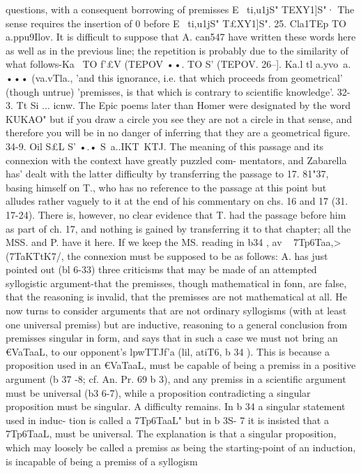 {{{{{{{{{{{{questions, with a consequent borrowing of premisses E~ ti,u1jS"
TEXY1]S"·
The sense requires the insertion of 0 before E~ ti,u1jS" T£XY1]S".
25. Cla1TEp TO a.ppu9Ilov. It is difficult to suppose that A. can547
have written these words here as well as in the previous line; the
repetition is probably due to the similarity of what follows-Ka~
TO f'£V (TEPOV ••. TO S' (TEPOV.
26--]. Ka.l tl a.yvo~a. ••• (va.vTla., 'and this ignorance, i.e. that
which proceeds from geometrical' (though untrue) 'premisses, is
that which is contrary to scientific knowledge'.
32-3. Tt Si ... icnw. The Epic poems later than Homer were
designated by the word KUKAO" but if you draw a circle you see
they are not a circle in that sense, and therefore you will be in
no danger of inferring that they are a geometrical figure.
34-9. Oil S£L S' •.• S~a.}.IKT~KTJ. The meaning of this passage
and its connexion with the context have greatly puzzled com-
mentators, and Zabarella has' dealt with the latter difficulty
by transferring the passage to 17. 81"37, basing himself on T.,
who has no reference to the passage at this point but alludes
rather vaguely to it at the end of his commentary on chs. 16 and
17 (31. 17-24). There is, however, no clear evidence that T. had
the passage before him as part of ch. 17, and nothing is gained by
transferring it to that chapter; all the MSS. and P. have it here.
If we keep the MS. reading in b34 , av ~ 7Tp6Taa,> (7TaKTtK7/, the
connexion must be supposed to be as follows: A. has just pointed
out (bl 6-33) three criticisms that may be made of an attempted
syllogistic argument-that the premisses, though mathematical
in fonn, are false, that the reasoning is invalid, that the premisses
are not mathematical at all. He now turns to consider arguments
that are not ordinary syllogisms (with at least one universal
premiss) but are inductive, reasoning to a general conclusion
from premisses singular in form, and says that in such a case
we must not bring an €VaTaaL, to our opponent's lpwTTJf'a (lil,
atiT6, b 34 ). This is because a proposition used in an €VaTaaL, must
be capable of being a premiss in a positive argument (b 37 -8; cf.
An. Pr. 69 b 3), and any premiss in a scientific argument must be
universal (b3 6-7), while a proposition contradicting a singular
proposition must be singular.
A difficulty remains. In b 34 a singular statement used in induc-
tion is called a 7Tp6TaaL" but in b 3S- 7 it is insisted that a 7Tp6TaaL,
must be universal. The explanation is that a singular proposition,
which may loosely be called a premiss as being the starting-point
of an induction, is incapable of being a premiss of a syllogism
}}}}}}}}}}}
